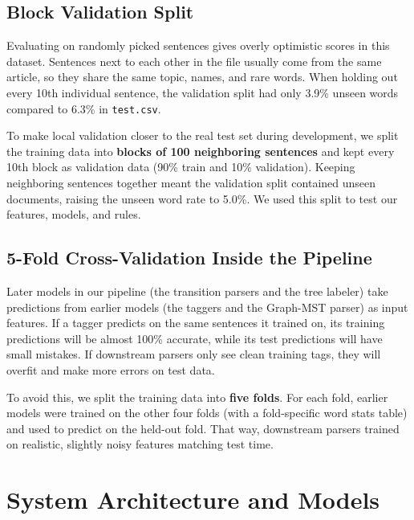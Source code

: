 \documentclass[11pt,a4paper]{article}
\begin{document}
\subsection{Block Validation Split}
Evaluating on randomly picked sentences gives overly optimistic scores in this dataset. Sentences next to each other in the file usually come from the same article, so they share the same topic, names, and rare words. When holding out every 10th individual sentence, the validation split had only 3.9\% unseen words compared to 6.3\% in \texttt{test.csv}.

To make local validation closer to the real test set during development, we split the training data into \textbf{blocks of 100 neighboring sentences} and kept every 10th block as validation data (90\% train and 10\% validation). Keeping neighboring sentences together meant the validation split contained unseen documents, raising the unseen word rate to 5.0\%. We used this split to test our features, models, and rules.

\subsection{5-Fold Cross-Validation Inside the Pipeline}
Later models in our pipeline (the transition parsers and the tree labeler) take predictions from earlier models (the taggers and the Graph-MST parser) as input features. If a tagger predicts on the same sentences it trained on, its training predictions will be almost 100\% accurate, while its test predictions will have small mistakes. If downstream parsers only see clean training tags, they will overfit and make more errors on test data.

To avoid this, we split the training data into \textbf{five folds}. For each fold, earlier models were trained on the other four folds (with a fold-specific word stats table) and used to predict on the held-out fold. That way, downstream parsers trained on realistic, slightly noisy features matching test time.

\section{System Architecture and Models}
\end{document}
